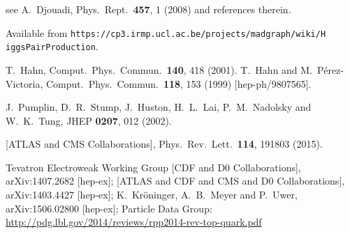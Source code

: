   see \eg  
  A.~Djouadi,
  Phys.\ Rept.\  {\bf 457}, 1 (2008) and references therein.
  
 Available from \texttt{https://cp3.irmp.ucl.ac.be/projects/madgraph/wiki/H
    iggsPairProduction}.

  T.~Hahn,
  Comput.\ Phys.\ Commun.\  {\bf 140}, 418 (2001).
  T.~Hahn and M.~P\'erez-Victoria,
  Comput.\ Phys.\ Commun.\  {\bf 118}, 153 (1999)
  [hep-ph/9807565].

  J.~Pumplin, D.~R.~Stump, J.~Huston, H.~L.~Lai, P.~M.~Nadolsky and W.~K.~Tung,
  JHEP {\bf 0207}, 012 (2002).
  
  [ATLAS and CMS Collaborations],
  Phys.\ Rev.\ Lett.\  {\bf 114}, 191803 (2015).

  Tevatron Electroweak Working Group [CDF and D0 Collaborations],
  arXiv:1407.2682 [hep-ex];
  [ATLAS and CDF and CMS and D0 Collaborations],
  arXiv:1403.4427 [hep-ex];
  K.~Kr\"oninger, A.~B.~Meyer and P.~Uwer,
  arXiv:1506.02800 [hep-ex];
  Particle Data Group:
  \url{http://pdg.lbl.gov/2014/reviews/rpp2014-rev-top-quark.pdf}

